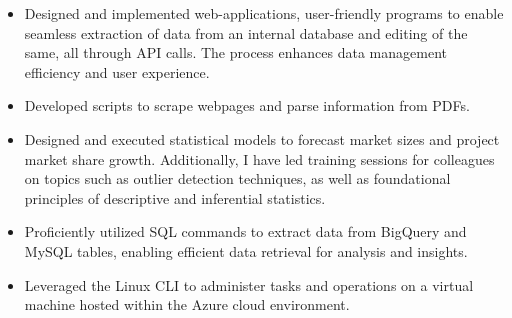 \documentclass[9pt,a4paper]{altacv}
\begin{document}
\begin{paracol}{2}

\begin{itemize}
    \item Designed and implemented web-applications, user-friendly programs to enable seamless extraction of data from an internal database and editing of the same, all through API calls. The process enhances data management efficiency and user experience.
    \item Developed scripts to scrape webpages and parse information from PDFs.
    \item Designed and executed statistical models to forecast market sizes and project market share growth. Additionally, I have led training sessions for colleagues on topics such as outlier detection techniques, as well as foundational principles of descriptive and inferential statistics.
    \item Proficiently utilized SQL commands to extract data from BigQuery and MySQL tables, enabling efficient data retrieval for analysis and insights.
    \item Leveraged the Linux CLI to administer tasks and operations on a virtual machine hosted within the Azure cloud environment.
\end{itemize}


\end{paracol}
\end{document}
